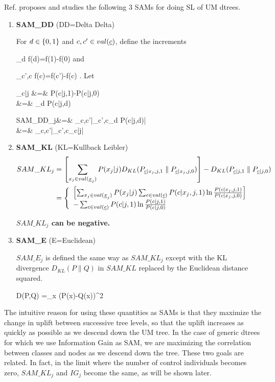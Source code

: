 \documentclass[12pt]{report}
\begin{document}
Ref.\cite{jaros}
proposes and studies
the following
3 SAMs
for doing SL of UM dtrees.


\begin{enumerate}
\item{\bf SAM\_DD} (DD=Delta Delta)

For $d\in \{0,1\}$
and $c, c'\in val(\rvc)$, define the increments

\beq
\partial_d f(d)=f(1)-f(0)
\eeq
and

\beq
\partial_{c',c} f(c)=f(c')-f(c)
\;.
\eeq
Let

\beqa
\Delta_{c|j} &=& P(c|j,1)-P(c|j,0)
\\
&=& \partial_d P(c|j,d)
\label{eq-delta-c-j}
\eeqa

\beqa
SAM\_DD_j&=& \max_{c,c'}|\partial_{c',c}\partial_d P(c|j,d)|
\\
&=&
\max_{c,c'}|\partial_{c',c}\Delta_{c|j}|
\eeqa

\item{\bf SAM\_KL} (KL=Kullback Leibler)
\begin{align}
SAM\_KL_j&=
\left[
\sum_{x_j\in val(\rvx_j)}
P(x_j|j)
D_{KL}(P_{\rvc|x_j,j,1}\parallel P_{\rvc|x_j,j,0})
\right]
-
D_{KL}(P_{\rvc|j,1}\parallel P_{\rvc|j,0})
\\
&=\left\{\begin{array}{l}
\left[
\sum_{x_j\in val(\rvx_j)}
P(x_j|j)
 \sum_{c\in val(\rvc)}P(c|x_j,j,1)
\ln \frac{P(c|x_j,j,1) }{ P(c|x_j,j,0) }
\right]
\\
-
\sum_{c\in val(\rvc)}
P(c|j,1)
\ln \frac{P(c|j,1) }{ P(c|j,0) }
\end{array}
\right.
\label{eq-sam-kl}
\end{align}

{\bf $SAM\_KL_j$ can be negative.}

\item {\bf SAM\_E} (E=Euclidean)

$SAM\_E_j$ is defined the same way as $SAM\_KL_j$
except with
the KL divergence $D_{KL}(P\parallel Q)$
in $SAM\_KL$ replaced
by the Euclidean distance squared.


\beq
D(P,Q) =\sum_x (P(x)-Q(x))^2
\eeq

\end{enumerate}

The intuitive reason for
 using these quantities as
SAMs is that they maximize the change in uplift
between
successive tree levels, so
that the uplift increases as quickly as possible
as we descend down the UM tree.
In the case of generic dtrees
for which we use Information Gain as SAM, we
are maximizing the correlation
between classes and nodes as we descend down the tree.
These two goals are related.
In fact, in the limit
where the
number of control individuals
becomes zero,
$SAM\_KL_j$ and $IG_j$
become the same, as will be shown later.
\end{document}
